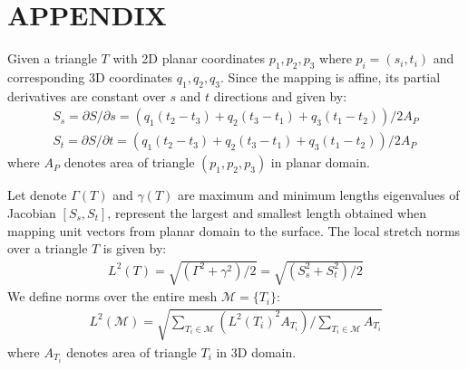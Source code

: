 \documentclass[a4paper,twoside]{article}
\begin{document}

{\small
}
\section*{APPENDIX}
\label{sec:appendix}
\noindent Given a triangle $T$ with 2D planar coordinates $p_1,p_2,p_3$ where $p_i = (s_i,t_i)$  and corresponding 3D coordinates $q_1,q_2,q_3$. Since the mapping is affine, its partial derivatives are constant over $s$ and $t$ directions and given by:
{\small \begin{align*}
S_s=\partial S/\partial s = (q_1(t_2-t_3)+q_2(t_3-t_1)+q_3(t_1-t_2))/2A_P\\ 
S_t=\partial S/\partial t = (q_1(t_2-t_3)+q_2(t_3-t_1)+q_3(t_1-t_2))/2A_P
\end{align*}}where $A_P$ denotes area of triangle $(p_1,p_2,p_3)$ in planar domain. 

Let denote $\Gamma(T)$ and $\gamma(T)$ are maximum and minimum lengths eigenvalues of Jacobian $[S_s,S_t]$, represent the largest and smallest length obtained when mapping unit vectors from planar domain to the surface. The local stretch norms over a triangle $T$ is given by:
{\small \begin{align*}
	L^{2}(T)=\sqrt{(\Gamma^2 + \gamma^2)/2} = \sqrt{(S_{s}^2 + S_{t}^2)/2}
\end{align*}}
We define norms over the entire mesh $\mathscr{M}=\{T_i\}$: 
{\small \begin{align*}
	L^{2}(\mathscr{M})=\sqrt{\sum\limits_{T_i \in \mathscr{M}}({L^{2}(T_i)}^2 A_{T_i})/\sum\limits_{T_i \in \mathscr{M}}A_{T_i}}
	\end{align*}}where $A_{T_i}$ denotes area of triangle $T_i$ in 3D domain.
\vfill
\end{document}
